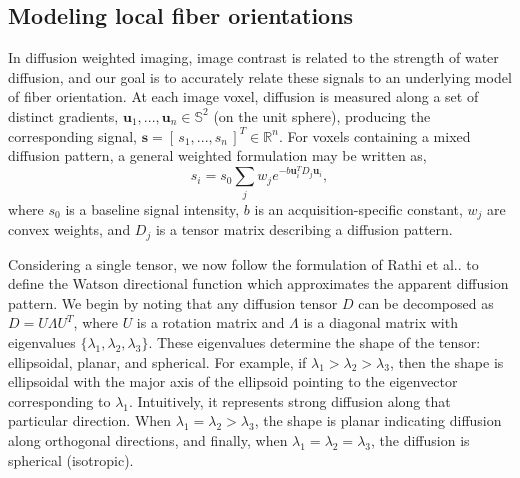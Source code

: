\documentclass[letterpaper,hyperref,12pt]{gatech-thesis}
\makeatletter
\renewcommand{\v}[1]{\ensuremath{\mathbf #1}\xspace}
\newcommand{\rv}[1]{\ensuremath{[\, #1 \,]}\xspace} %
\DeclareRobustCommand\onedot{\futurelet\@let@token\@onedot}
\def\@onedot{\ifx\@let@token.\else.\null\fi\xspace}
\newcommand{\etal}{et al\onedot}
\newcommand{\R}{\ensuremath{\mathbb R}}
\renewcommand{\S}{\ensuremath{\mathbb S}}
\newcommand{\s}{\v s}
\renewcommand{\u}{\v u}
\makeatother
\begin{document}
\subsection{Modeling local fiber orientations} \label{sec:model}

In diffusion weighted imaging, image contrast is related to the strength of
water diffusion, and our goal is to accurately relate these signals to an
underlying model of fiber orientation.  At each image voxel, diffusion is
measured along a set of distinct gradients, $\u_1,...,\u_n\in\S^2$ (on the
unit sphere), producing the corresponding signal,
$\s=\rv{s_1,...,s_n}^T\in\R^n$.  For voxels containing a mixed diffusion
pattern, a general weighted formulation may be written as,
\begin{equation} \label{eq:general_model}
  s_i = s_0 \sum_j w_j e^{ -b \u_i^T D_j \u_i },
\end{equation}
where $s_0$ is a baseline signal intensity, $b$ is an acquisition-specific
constant, $w_j$ are convex weights, and $D_j$ is a tensor matrix describing a
diffusion pattern.

Considering a single tensor, we now follow the formulation of Rathi
\etal\cite{Rathi2009mia_w} to define the Watson directional function which
approximates the apparent diffusion pattern.  We begin by noting that any
diffusion tensor $D$ can be decomposed as $D = U \Lambda U^T$, where $U$ is a
rotation matrix and $\Lambda$ is a diagonal matrix with eigenvalues
$\{\lambda_1, \lambda_2, \lambda_3\}$.  These eigenvalues determine the shape
of the tensor:  ellipsoidal, planar, and spherical.  For example, if
$\lambda_1 > \lambda_2 > \lambda_3$, then the shape is ellipsoidal with the
major axis of the ellipsoid pointing to the eigenvector corresponding to
$\lambda_1$.  Intuitively, it represents strong diffusion along that
particular direction.  When $\lambda_1 = \lambda_2 > \lambda_3$, the shape is
planar indicating diffusion along orthogonal directions, and finally, when
$\lambda_1 = \lambda_2 = \lambda_3$, the diffusion is spherical (isotropic).
\end{document}
